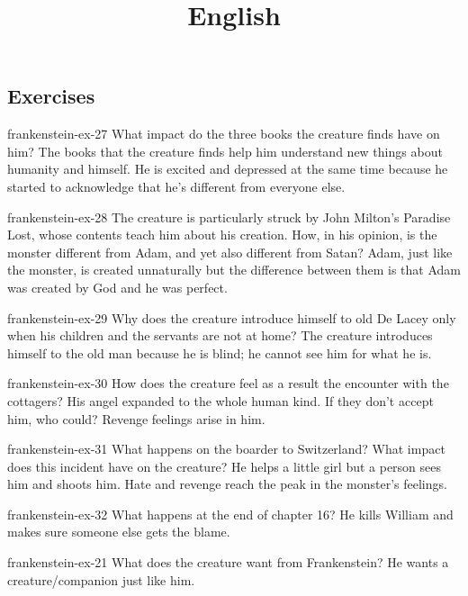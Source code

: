 \documentclass[preview]{standalone}
\begin{document}
\title{English}
\genpage

\subsection{Exercises}

\begin{snippetexercise}{frankenstein-ex-27}
    {What impact do the three books the creature finds have on him?}
    The books that the creature finds help him understand new things
    about humanity and himself. He is excited and depressed at the same time because
    he started to acknowledge that he's different from everyone else.
\end{snippetexercise}

\begin{snippetexercise}{frankenstein-ex-28}
    {The creature is particularly struck by John Milton's Paradise Lost, whose contents teach him about his
    creation. How, in his opinion, is the monster different from Adam, and yet also different from Satan?}
    Adam, just like the monster, is created unnaturally but the difference
    between them is that Adam was created by God and he was perfect. 
\end{snippetexercise}

\begin{snippetexercise}{frankenstein-ex-29}
    {Why does the creature introduce himself to old De Lacey only when his children and the servants are not
    at home?}
    The creature introduces himself to the old man because he is blind; he cannot see him
    for what he is.
\end{snippetexercise}

\begin{snippetexercise}{frankenstein-ex-30}
    {How does the creature feel as a result the encounter with the cottagers?}
    His angel expanded to the whole human kind.
    If they don't accept him, who could? Revenge feelings
    arise in him. 
\end{snippetexercise}

\begin{snippetexercise}{frankenstein-ex-31}
    {What happens on the boarder to Switzerland? What impact does this incident have on the creature?}
    He helps a little girl but a person sees him and shoots him.
    Hate and revenge reach the peak in the monster's feelings.
\end{snippetexercise}

\begin{snippetexercise}{frankenstein-ex-32}
    {What happens at the end of chapter 16?}
    He kills William and makes sure someone else gets the blame.
\end{snippetexercise}

\begin{snippetexercise}{frankenstein-ex-21}
    {What does the creature want from Frankenstein?}
    He wants a creature/companion just like him.
\end{snippetexercise}
\end{document}
